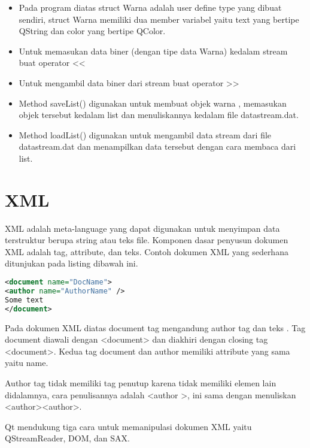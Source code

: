\begin{itemize}

\item
  Pada program diatas struct Warna adalah user define type yang dibuat
  sendiri, struct Warna memiliki dua member variabel yaitu text yang
  bertipe QString dan color yang bertipe QColor.
\item
  Untuk memasukan data biner (dengan tipe data Warna) kedalam stream
  buat operator \textless{}\textless{}
\item
  Untuk mengambil data biner dari stream buat operator
  \textgreater{}\textgreater{}
\item
  Method saveList() digunakan untuk membuat objek warna , memasukan
  objek tersebut kedalam list dan menuliskannya kedalam file
  datastream.dat.
\item
  Method loadList() digunakan untuk mengambil data stream dari file
  datastream.dat dan menampilkan data tersebut dengan cara membaca dari
  list.
\end{itemize}

\section{XML}\label{xml}

XML adalah meta-language yang dapat digunakan untuk menyimpan data
terstruktur berupa string atau teks file. Komponen dasar penyusun
dokumen XML adalah tag, attribute, dan teks. Contoh dokumen XML yang
sederhana ditunjukan pada listing dibawah ini.

\begin{lstlisting}[language=xml]
<document name="DocName">
<author name="AuthorName" />
Some text
</document>
\end{lstlisting}

Pada dokumen XML diatas document tag mengandung author tag dan teks . Tag document diawali
dengan \textless{}document\textgreater{} dan diakhiri dengan closing tag 
\textless{}\textfractionsolidus{}document\textgreater{}. Kedua tag document dan author
memiliki attribute yang sama yaitu name.

Author tag tidak memiliki tag penutup karena tidak memiliki elemen lain didalamnya, cara penulisannya
adalah \textless{}author \textfractionsolidus{}\textgreater{}, ini sama dengan menuliskan 
\textless{}author\textgreater{}\textless{}\textfractionsolidus{}author\textgreater{}.

Qt mendukung tiga cara untuk memanipulasi dokumen XML yaitu
QStreamReader, DOM, dan SAX.

